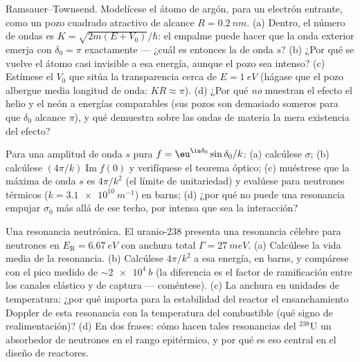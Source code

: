\begin{exercise}[$\star\star$]\label{exo:b3:scattering-theory:8}
Ramsauer--Townsend. Modelícese el átomo de argón, para un electrón
entrante, como un pozo cuadrado atractivo de alcance $R =
\qty{0.2}{nm}$. (a) Dentro, el número de ondas es $K =
\sqrt{2m(E + V_0)}/\hbar$: el empalme puede hacer que la onda exterior
emerja con $\delta_0 = \pi$ exactamente --- ¿cuál es entonces la  de onda $s$? (b) ¿Por qué se vuelve el átomo casi invisible a esa
energía, aunque el pozo sea intenso? (c) Estímese el $V_0$
que sitúa la transparencia cerca de $E = \qty{1}{eV}$ (hágase que el pozo
albergue media longitud de onda: $KR \approx \pi$). (d) ¿Por qué \emph{no}
muestran el efecto el helio y el neón a energías comparables (sus pozos son
demasiado someros para que $\delta_0$ alcance $\pi$), y qué demuestra sobre
las ondas de materia la mera existencia del efecto?
\end{exercise}

\begin{exercise}[$\star\star$]\label{exo:b3:scattering-theory:9}
Para una amplitud de onda $s$ pura $f = \eu^{\iu\delta_0}\sin\delta_0/
k$: (a) calcúlese $\sigma$; (b) calcúlese $(4\pi/k)\operatorname{Im}
f(0)$ y verifíquese el teorema óptico; (c) muéstrese que la 
máxima de onda $s$ es $4\pi/k^2$ (el límite de unitariedad) y
evalúese para neutrones térmicos ($k = \qty{3.1e10}{m^{-1}}$) en
barns; (d) ¿por qué no puede una resonancia empujar $\sigma_0$ más allá de
ese techo, por intensa que sea la interacción?
\end{exercise}

\begin{exercise}[$\star\star\star$]\label{exo:b3:scattering-theory:10}
Una resonancia neutrónica. El uranio-238 presenta una resonancia célebre
para neutrones en $E_{\text{R}} = \qty{6.67}{eV}$ con anchura total
$\Gamma = \qty{27}{meV}$. (a) Calcúlese la vida media de la resonancia.
(b) Calcúlese $4\pi/k^2$ a esa energía, en barns, y compárese con
el pico medido de $\sim\qty{2e4}{b}$ (la diferencia es el factor de
ramificación entre los canales elástico y de captura ---
coméntese). (c) La anchura en unidades de temperatura: ¿por qué importa
para la estabilidad del reactor el ensanchamiento Doppler de esta resonancia
con la temperatura del combustible (qué signo de realimentación)? (d) En dos
frases: cómo hacen tales resonancias del $^{238}$U un absorbedor de
neutrones en el rango epitérmico, y por qué es eso central en el diseño de
reactores.
\end{exercise}

